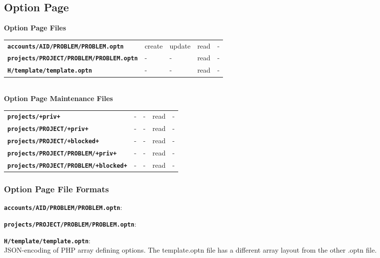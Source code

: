\documentclass[12pt]{article}
\newenvironment{indpar}[1][0.4in]%
	{\begin{list}{}%
		     {\setlength{\itemsep}{0in}%
		      \setlength{\topsep}{0in}%
		      \setlength{\parsep}{1ex}%
		      \setlength{\labelwidth}{#1}%
		      \setlength{\leftmargin}{#1}%
		      \addtolength{\leftmargin}{\labelsep}}%
	 \item}%
	{\end{list}}
\newenvironment{itemlist}[1][0.2in]%
	{\begin{list}{}{\setlength{\labelwidth}{#1}%
		        \setlength{\leftmargin}{\labelwidth}%
		        \addtolength{\leftmargin}{+0.2in}%
		        \addtolength{\linewidth}{-\labelwidth}%
		        \addtolength{\linewidth}{-0.2in}%
		        \renewcommand{\makelabel}[1]{##1\hfill}}
	 \raggedright}%
	{\end{list}}
\newcommand{\TT}[1]{{\tt \bfseries #1}}
\begin{document}
\newpage

\subsection{Option Page}

\begin{center}
{\bf Option Page Files}
\\[1ex]
\begin{tabular}{lllll}
\TT{accounts/AID/PROBLEM/PROBLEM.optn}  & create  & update & read & - \\
\TT{projects/PROJECT/PROBLEM/PROBLEM.optn} & -  & -  & read & - \\
\TT{H/template/template.optn} & -  & -  & read & - \\
\end{tabular}
\\\bigskip
{\bf Option Page Maintenance Files}
\\[1ex]
\begin{tabular}{lllll}
\TT{projects/+priv+}			& -  & - & read & - \\
\TT{projects/PROJECT/+priv+}		& -  & - & read & - \\
\TT{projects/PROJECT/+blocked+}		& -  & - & read & - \\
\TT{projects/PROJECT/PROBLEM/+priv+}	& -  & - & read & - \\
\TT{projects/PROJECT/PROBLEM/+blocked+}	& -  & - & read & - \\
\end{tabular}
\end{center}

\subsubsection{Option Page File Formats}

\begin{indpar}
\begin{itemlist}
\item[\TT{accounts/AID/PROBLEM/PROBLEM.optn}:]
\item[\TT{projects/PROJECT/PROBLEM/PROBLEM.optn}:]\vspace*{-1ex}
\item[\TT{H/template/template.optn}:]\vspace*{-1ex} ~
\label{PROBLEM.OPTN} \\
    JSON-encoding of PHP array defining options.
    The template.optn file has a different array layout
    from the other .optn file.
\end{itemlist}
\end{indpar}
\end{document}
